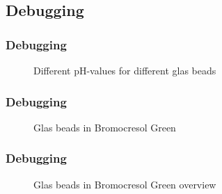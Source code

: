 \subsection{Debugging}
\begin{frame}
	\frametitle{Debugging}
	\vspace{1cm} %
	\begin{figure}
	  \centering
	  \begin{minipage}[t]{0.45\textwidth}
	  \end{minipage}
	  \begin{minipage}[t]{0.45\textwidth}
	  \end{minipage}
	  \caption{Different pH-values for different glas beads}
	\end{figure}
 
\end{frame}


\begin{frame}
	\frametitle{Debugging}
	\vspace{1cm} %
	\begin{figure}
	  \centering
	  \begin{minipage}[t]{0.3\textwidth}
	  \end{minipage}
	  \begin{minipage}[t]{0.3\textwidth}
	  \end{minipage}
	  \begin{minipage}[t]{0.3\textwidth}
	  \end{minipage}
	  
	  \caption{Glas beads in Bromocresol Green}
	\end{figure}
 
\end{frame}


\begin{frame}
	\frametitle{Debugging}
	\begin{figure}
	  \centering
	  \caption{Glas beads in Bromocresol Green overview}
	\end{figure}
 
\end{frame}

